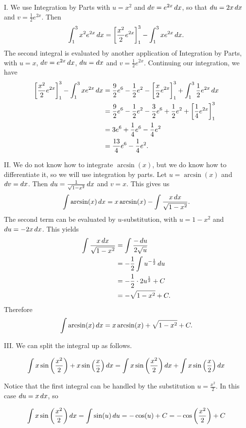 \documentclass[]{ximera}
\begin{document}
\begin{freeResponse}
I. We use Integration by Parts with $u = x^2$ and $\mathop{}\!d v = e^{2x} \mathop{}\!d x$, so that $\mathop{}\!d u = 2x \mathop{}\!d x$ and $v = \frac{1}{2} e^{2x}$. Then
$$
\int_1^3 x^2 e^{2x} \mathop{}\!d x = \bigg[ \frac{x^2}{2} e^{2x} \bigg]_1^3 - \int_1^3 x e^{2x} \mathop{}\!d x.
$$
The second integral is evaluated by another application of Integration by Parts, with $u =x$, $\mathop{}\!d v = e^{2x} \mathop{}\!d x$, $\mathop{}\!d u = \mathop{}\!d x$ and $v = \frac{1}{2}e^{2x}$. Continuing our integration, we have 
\begin{align*}
\bigg[ \frac{x^2}{2} e^{2x} \bigg]_1^3 - \int_1^3 x e^{2x} \mathop{}\!d x & = \frac{9}{2} e^6 - \frac{1}{2} e^2 - \bigg[ \frac{x}{2}e^{2x} \bigg]_1^3 + \int_1^3 \frac{1}{2} e^{2x} \mathop{}\!d x \\
& = \frac{9}{2} e^6 - \frac{1}{2} e^2 - \frac{3}{2} e^6 + \frac{1}{2} e^2 + \bigg[ \frac{1}{4}e^{2x} \bigg]_1^3 \\
& = 3e^6 + \frac{1}{4} e^6 - \frac{1}{4} e^2 \\
& = \frac{13}{4} e^6 - \frac{1}{4} e^2.
\end{align*}

II. We do not know how to integrate $\arcsin(x)$, but we do know how to differentiate it, so we will use integration by parts. Let $u = \arcsin(x)$ and $\mathop{}\!d v =  \mathop{}\!d x$. Then $\mathop{}\!d u = \frac{1}{\sqrt{1-x^2}} \mathop{}\!d x$ and $v = x$. This gives us
$$
\int \arcsin(x) \mathop{}\!d x = x\arcsin(x) - \int \frac{x \mathop{}\!d x}{\sqrt{1-x^2}}.
$$
The second term can be evaluated by $u$-substitution, with $u = 1- x^2$ and $\mathop{}\!d u = -2x \mathop{}\!d x$.  This yields
	\begin{align*}
	\int \frac{x \mathop{}\!d x}{\sqrt{1-x^2}} &= \int \frac{-\mathop{}\!d u}{2\sqrt{u}}\\
	&= -\frac{1}{2} \int u^{-\frac{1}{2}} \mathop{}\!d u \\
	&= -\frac{1}{2} \cdot 2u^{\frac{1}{2}} +C \\
	&= - \sqrt{1-x^2} +C.
	\end{align*}
Therefore
$$
	\int \arcsin(x) \mathop{}\!d x  = x\arcsin(x) + \sqrt{1-x^2} +C.
	$$

III. We can split the integral up as follows.

\[
\int x\sin\left(\frac{x^2}{2}\right) + x\sin\left(\frac{x}{2}\right) \mathop{}\!d x = \int x\sin\left(\frac{x^2}{2}\right)  \mathop{}\!d x+\int  x\sin\left(\frac{x}{2}\right) \mathop{}\!d x
\]

Notice that the first integral can be handled by the substitution $u = \frac{x^2}{2}$.  In this case $\mathop{}\!d u = x \mathop{}\!d x$, so

\[
 \int x\sin\left(\frac{x^2}{2}\right)  \mathop{}\!d x = \int \sin(u) \mathop{}\!d u = -\cos(u) +C=-\cos\left(\frac{x^2}{2}\right)+C
\]


\end{freeResponse}
\end{document}
